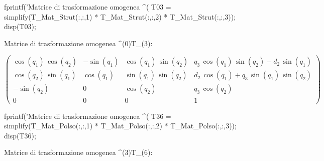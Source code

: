 \documentclass[11pt, a4paper]{article}
\begin{document}
\begin{matlabcode}
fprintf('Matrice di trasformazione omogenea ^(%
T03 = simplify(T_Mat_Strut(:,:,1) * T_Mat_Strut(:,:,2) * T_Mat_Strut(:,:,3));
disp(T03);
\end{matlabcode}
\begin{matlaboutput}
Matrice di trasformazione omogenea ^(0)T_(3):
\end{matlaboutput}
\begin{matlabsymbolicoutput}
$\displaystyle \left(\begin{array}{cccc}
\cos \left(q_1 \right)\,\cos \left(q_2 \right) & -\sin \left(q_1 \right) & \cos \left(q_1 \right)\,\sin \left(q_2 \right) & q_3 \,\cos \left(q_1 \right)\,\sin \left(q_2 \right)-d_2 \,\sin \left(q_1 \right)\\
\cos \left(q_2 \right)\,\sin \left(q_1 \right) & \cos \left(q_1 \right) & \sin \left(q_1 \right)\,\sin \left(q_2 \right) & d_2 \,\cos \left(q_1 \right)+q_3 \,\sin \left(q_1 \right)\,\sin \left(q_2 \right)\\
-\sin \left(q_2 \right) & 0 & \cos \left(q_2 \right) & q_3 \,\cos \left(q_2 \right)\\
0 & 0 & 0 & 1
\end{array}\right)$
\end{matlabsymbolicoutput}
\newpage
\begin{matlabcode}
fprintf('Matrice di trasformazione omogenea ^(%
T36 = simplify(T_Mat_Polso(:,:,1) * T_Mat_Polso(:,:,2) * T_Mat_Polso(:,:,3));
disp(T36);
\end{matlabcode}
\begin{matlaboutput}
Matrice di trasformazione omogenea ^(3)T_(6):
\end{matlaboutput}
\begin{matlabsymbolicoutput}
\end{matlabsymbolicoutput}
\end{document}

